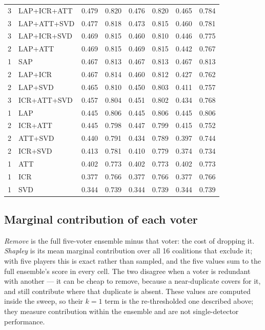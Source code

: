 \begin{table}[h]
\begin{tabular}{r l c c c c c c}
    3 & LAP+ICR+ATT & 0.479 & 0.820 & 0.476 & 0.820 & 0.465 & 0.784 \\
    3 & LAP+ATT+SVD & 0.477 & 0.818 & 0.473 & 0.815 & 0.460 & 0.781 \\
    3 & LAP+ICR+SVD & 0.469 & 0.815 & 0.460 & 0.810 & 0.446 & 0.775 \\
    2 & LAP+ATT & 0.469 & 0.815 & 0.469 & 0.815 & 0.442 & 0.767 \\
    1 & SAP & 0.467 & 0.813 & 0.467 & 0.813 & 0.467 & 0.813 \\
    2 & LAP+ICR & 0.467 & 0.814 & 0.460 & 0.812 & 0.427 & 0.762 \\
    2 & LAP+SVD & 0.465 & 0.810 & 0.450 & 0.803 & 0.411 & 0.757 \\
    3 & ICR+ATT+SVD & 0.457 & 0.804 & 0.451 & 0.802 & 0.434 & 0.768 \\
    1 & LAP & 0.445 & 0.806 & 0.445 & 0.806 & 0.445 & 0.806 \\
    2 & ICR+ATT & 0.445 & 0.798 & 0.447 & 0.799 & 0.415 & 0.752 \\
    2 & ATT+SVD & 0.440 & 0.791 & 0.434 & 0.789 & 0.397 & 0.744 \\
    2 & ICR+SVD & 0.413 & 0.781 & 0.410 & 0.779 & 0.374 & 0.734 \\
    1 & ATT & 0.402 & 0.773 & 0.402 & 0.773 & 0.402 & 0.773 \\
    1 & ICR & 0.377 & 0.766 & 0.377 & 0.766 & 0.377 & 0.766 \\
    1 & SVD & 0.344 & 0.739 & 0.344 & 0.739 & 0.344 & 0.739 \\
    \hline\end{tabular}\end{table}

\subsection{Marginal contribution of each voter}

\emph{Remove} is the full five-voter ensemble minus that voter: the cost of
dropping it. \emph{Shapley} is its mean marginal contribution over all 16 coalitions that
exclude it; with five players this is exact rather than sampled, and the five values sum to
the full ensemble's score in every cell. The two disagree when a voter is redundant with
another --- it can be cheap to remove, because a near-duplicate covers for it, and still
contribute where that duplicate is absent. These values are computed inside the sweep, so
their $k{=}1$ term is the re-thresholded one described above; they measure contribution
within the ensemble and are not single-detector performance.

